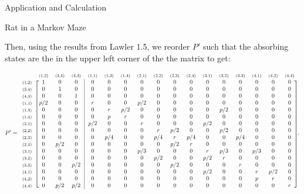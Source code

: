 \documentclass[12pt]{article}
\newcommand{\matindex}[1]{\mbox{\scriptsize#1}}
\newcommand\scalemath[2]{\scalebox{#1}{\mbox{\ensuremath{\displaystyle #2}}}}
\numberwithin{equation}{section}
\begin{document}
\begin{section}{Application and Calculation}
\begin{subsection}{Rat in a Markov Maze}
\begin{enumerate}
        Then, using the results from Lawler 1.5, we reorder $P'$ such that the absorbing states are the in the upper left corner of the the matrix to get:

        \[\scalemath{0.75}{P'=\begin{blockarray}{ccccccccccccccccc}&\matindex{(1,2)}&\matindex{(3,4)}&\matindex{(4,3)}&\matindex{(1,1)}&\matindex{(1,3)}&\matindex{(1,4)}&\matindex{(2,1)}&\matindex{(2,2)}&\matindex{(2,3)}&\matindex{(2,4)}&\matindex{(3,1)}&\matindex{(3,2)}&\matindex{(3,3)}&\matindex{(4,1)}&\matindex{(4,2)}&\matindex{(4,4)}\\
        \begin{block}{c[ccc|ccccccccccccc]}\matindex{(1,2)}&1&0&0&0&0&0&0&0&0&0&0&0&0&0&0&0\\
        \matindex{(3,4)}&0&1&0&0&0&0&0&0&0&0&0&0&0&0&0&0\\
        \matindex{(4,3)}&0&0&1&0&0&0&0&0&0&0&0&0&0&0&0&0\\
        \matindex{(1,1)}&p/2&0&0&r&0&0&p/2&0&0&0&0&0&0&0&0&0\\
        \matindex{(1,3)}&0&0&0&0&r&p/2&0&0&0&0&0&p/2&0&0&0&0\\
        \matindex{(1,4)}&0&0&0&0&p&r&0&0&0&0&0&0&0&0&0&0\\
        \matindex{(2,1)}&0&0&0&p/2&0&0&r&0&0&0&p/2&0&0&0&0&0\\
        \matindex{(2,2)}&0&0&0&0&0&0&0&r&p/2&0&0&p/2&0&0&0&0\\
        \matindex{(2,3)}&0&0&0&0&p/4&0&0&p/4&r&p/4&0&0&p/4&0&0&0\\
        \matindex{(2,4)}&0&p/2&0&0&0&0&0&0&p/2&r&0&0&0&0&0&0\\
        \matindex{(3,1)}&0&0&0&0&0&0&p/3&0&0&0&r&p/3&0&p/3&0&0\\
        \matindex{(3,2)}&0&0&0&0&0&0&0&p/2&0&0&p/2&r&0&0&0&0\\
        \matindex{(3,3)}&0&0&p/2&0&0&0&0&0&p/2&0&0&0&r&0&0&0\\
        \matindex{(4,1)}&0&0&0&0&0&0&0&0&0&0&p/2&0&0&r&p/2&0\\
        \matindex{(4,2)}&0&0&0&0&0&0&0&0&0&0&0&0&0&p&r&0\\
        \matindex{(4,4)}&0&p/2&p/2&0&0&0&0&0&0&0&0&0&0&0&0&r\\
        \end{block}
        \end{blockarray}.}\]


\end{enumerate}
\end{subsection}
\end{section}
\end{document}
